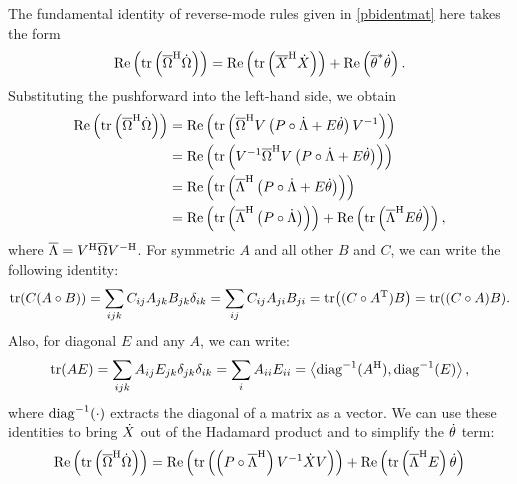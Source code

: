 \documentclass[../../main.tex]{subfiles}
\begin{document}
\begin{refsection}
	The fundamental identity of reverse-mode rules given in \cref{pbidentmat} here takes the form
	\begin{equation*}
		\Re \left( \tr \left( {\overline{\Omega}}^\mathrm{H} \dot{\Omega} \right) \right) =
		\Re \left( \tr \left( {\overline{X}}^\mathrm{H}      \dot{X}      \right) \right) +
		\Re \left( {\overline{\theta}}^* \dot{\theta}  \right).
	\end{equation*}
	Substituting the pushforward into the left-hand side, we obtain
	\begin{align*}
		\Re \left( \tr \left( {\overline{\Omega}}^\mathrm{H} \dot{\Omega} \right) \right)
		 & = \Re \left( \tr \left( {\overline{\Omega}}^\mathrm{H} V \left( P \circ \dot{\Lambda} + E \dot{\theta} \right) V^{-1} \right) \right) \\
		 & = \Re \left( \tr \left( V^{-1} {\overline{\Omega}}^\mathrm{H} V \left( P \circ \dot{\Lambda} + E \dot{\theta} \right) \right) \right) \\
		 & = \Re \left( \tr \left( {\overline{\Lambda}}^\mathrm{H} \left( P \circ \dot{\Lambda} + E \dot{\theta} \right) \right) \right)         \\
		 & = \Re \left( \tr \left( {\overline{\Lambda}}^\mathrm{H} \left( P \circ \dot{\Lambda} \right) \right) \right) +
		\Re \left( \tr \left( {\overline{\Lambda}}^\mathrm{H} E \dot{\theta} \right) \right),
	\end{align*}
	where $\overline{\Lambda} = {V}^\mathrm{H} \overline{\Omega} {V}^{-\mathrm{H}}$.
	For symmetric $A$ and all other $B$ and $C$, we can write the following identity:
	\begin{equation*}
		\tr(C (A \circ B)) = \sum_{ijk} C_{ij} A_{jk} B_{jk} \delta_{ik}
		= \sum_{ij} C_{ij} A_{ji} B_{ji}
		= \tr((C \circ {A}^\mathrm{T}) B)
		= \tr((C \circ A) B).
	\end{equation*}
	Also, for diagonal $E$ and any $A$, we can write:
	\begin{equation*}
		\tr(A E) = \sum_{ijk} A_{ij} E_{jk} \delta_{jk} \delta_{ik}
		= \sum_i A_{ii} E_{ii}
		= \left\langle \operatorname{diag}^{-1}({A}^\mathrm{H}), \operatorname{diag}^{-1}(E) \right\rangle,
	\end{equation*}
	where $\operatorname{diag}^{-1}(\cdot)$ extracts the diagonal of a matrix as a vector.
	We can use these identities to bring $\dot{X}$ out of the Hadamard product and to simplify the $\dot{\theta}$ term:
	\begin{align*}
		\Re \left( \tr \left( \hconj{\Dcot{\Omega}} \Dtan{\Omega} \right) \right)
		 & = \Re \left( \tr \left(  \left( P \circ \hconj{\Dcot{\Lambda}} \right) V^{-1} \Dtan{X} V \right) \right) +
		\Re \left( \tr \left( \hconj{\Dcot{\Lambda}} E \right) \Dtan{\theta} \right)                                  \\

\end{align*}
\end{refsection}
\end{document}
